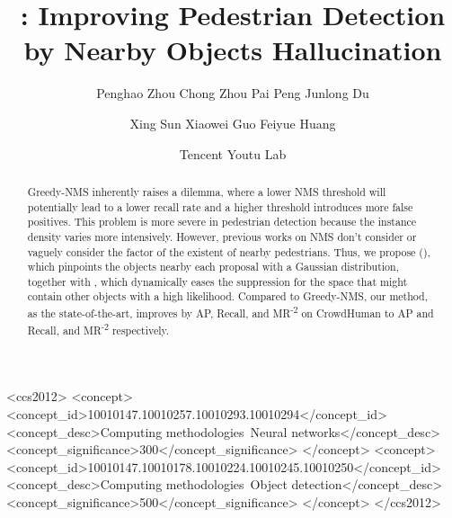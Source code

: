 \documentclass[sigconf]{acmart}
\begin{document}
\title{\nmsname{}: Improving Pedestrian Detection by Nearby Objects Hallucination}



\author{Penghao Zhou \quad Chong Zhou \quad Pai Peng \quad Junlong Du}
\author{Xing Sun \quad Xiaowei Guo \quad Feiyue Huang}
\author{Tencent Youtu Lab}


\renewcommand{\shortauthors}{Zhou, et al.}



\begin{abstract}
    Greedy-NMS inherently raises a dilemma, where a lower NMS threshold will potentially lead to a lower recall rate and a higher threshold introduces more false positives. This problem is more severe in pedestrian detection because the instance density varies more intensively. However, previous works on NMS don't consider or vaguely consider the factor of the existent of nearby pedestrians. Thus, we propose \heatmapname{} (\heatmapnameshort{}), which pinpoints the objects nearby each proposal with a Gaussian distribution, together with \nmsname{}, which dynamically eases the suppression for the space that might contain other objects with a high likelihood. Compared to Greedy-NMS, our method, as the state-of-the-art, improves by  AP,  Recall, and  MR\textsuperscript{-2} on CrowdHuman to  AP and  Recall, and  MR\textsuperscript{-2} respectively.
    
\end{abstract}



\begin{CCSXML}
<ccs2012>
   <concept>
       <concept_id>10010147.10010257.10010293.10010294</concept_id>
       <concept_desc>Computing methodologies~Neural networks</concept_desc>
       <concept_significance>300</concept_significance>
       </concept>
   <concept>
       <concept_id>10010147.10010178.10010224.10010245.10010250</concept_id>
       <concept_desc>Computing methodologies~Object detection</concept_desc>
       <concept_significance>500</concept_significance>
       </concept>
 </ccs2012>
\end{CCSXML}





\maketitle
\end{document}
